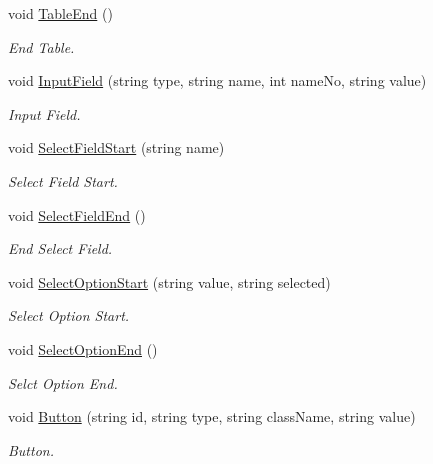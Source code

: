 \begin{DoxyCompactItemize}
void \hyperlink{classHTMLTags_a0655d9f70a8c1a61c406280d8fb9df7a}{Table\-End} ()
\begin{DoxyCompactList}\small\item\em End Table. \end{DoxyCompactList}\item 
void \hyperlink{classHTMLTags_a705aef36f0847c2a5f10a5df8e079ce8}{Input\-Field} (string type, string name, int name\-No, string value)
\begin{DoxyCompactList}\small\item\em Input Field. \end{DoxyCompactList}\item 
void \hyperlink{classHTMLTags_adb6e7ef0a1320dbf6d4acbe1ea3e418f}{Select\-Field\-Start} (string name)
\begin{DoxyCompactList}\small\item\em Select Field Start. \end{DoxyCompactList}\item 
void \hyperlink{classHTMLTags_adde967a90e03f4b5168b9bffd319980b}{Select\-Field\-End} ()
\begin{DoxyCompactList}\small\item\em End Select Field. \end{DoxyCompactList}\item 
void \hyperlink{classHTMLTags_a372570979ccc675e0ed752fe272e3cd6}{Select\-Option\-Start} (string value, string selected)
\begin{DoxyCompactList}\small\item\em Select Option Start. \end{DoxyCompactList}\item 
void \hyperlink{classHTMLTags_ae312980d20e3dea0469fdcb730fb975e}{Select\-Option\-End} ()
\begin{DoxyCompactList}\small\item\em Selct Option End. \end{DoxyCompactList}\item 
void \hyperlink{classHTMLTags_ab6dbb027d808e7b708a4ece7e911ceee}{Button} (string id, string type, string class\-Name, string value)
\begin{DoxyCompactList}\small\item\em Button. \end{DoxyCompactList}\end{DoxyCompactItemize}
